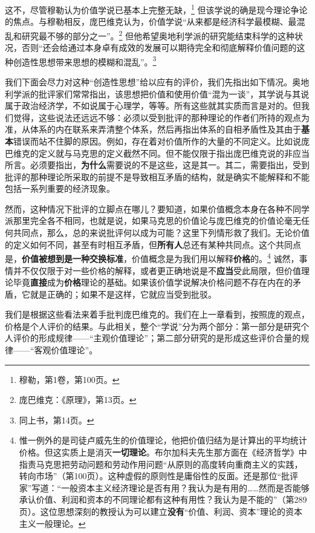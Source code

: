 \documentclass[fontset=fandol, a4paper, 12pt, openright]{ctexbook}
\begin{document}
这不，尽管穆勒认为价值学说已基本上完整无缺，\footnote{穆勒，第1卷，第100页。} 但该学说的确是现今理论争论的焦点。与穆勒相反，庞巴维克认为，价值学说“从来都是经济科学最模糊、最混乱和研究最不够的部分之一”。\footnote{庞巴维克：《原理》，第13页。} 但他希望奥地利学派的研究能结束科学的这种状况，否则“还会给通过本身卓有成效的发展可以期待完全和彻底解释价值问题的这种创造性思想带来思想的模糊和混乱”。\footnote{同上书，第14页。}

我们下面会尽力对这种“创造性思想”给以应有的评价，我们先指出如下情况。奥地利学派的批评家们常常指出，该思想把价值和使用价值“混为一谈”，其学说与其说属于政治经济学，不如说属于心理学，等等。所有这些就其实质而言是对的。但我们觉得，这些说法还远远不够：必须以受到批评的那种理论的作者们所持的观点为准，从体系的内在联系来弄清整个体系，然后再指出体系的自相矛盾性及其由于\textbf{基本}错误而站不住脚的原因。例如，存在着对价值所作的大量的不同定义。比如说庞巴维克的定义就与马克思的定义截然不同。但不能仅限于指出庞巴维克说的非应当所言。必须要指出，\textbf{为什么}需要说的不是这些，这是其一。其二，需要指出，受到批评的那种理论所采取的前提不是导致相互矛盾的结构，就是确实不能解释和不能包括一系列重要的经济现象。

然而，这种情况下批评的立脚点在哪儿？要知道，如果价值概念本身在各种不同学派那里完全各不相同，也就是说，如果马克思的价值论与庞巴维克的价值论毫无任何共同点，那么，总的来说批评何以成为可能？这里下列情形救了我们。无论价值的定义如何不同，甚至有时相互矛盾，但\textbf{所有人}总还有某种共同点。这个共同点是，\textbf{价值被想到是一种交换标准}，价值概念是为我们用以解释\textbf{价格}的。\footnote{惟一例外的是司徒卢威先生的价值理论，他把价值归结为是计算出的平均统计价格。但这实质上是消灭\textbf{一切理论}。布尔加科夫先生那方面在《经济哲学》中指责马克思把劳动问题和劳动作用问题“从原则的高度转向重商主义的实践，转向市场”（第100页）。这种虚假的原则性是庸俗性的反面。还是那位“批评家”写道：“一般资本主义经济理论是否有用？我认为是有用的……然而是否能够承认价值、利润和资本的不同理论都有这种有用性？我认为是不能的”（第289页）。这位思想深刻的教授认为可以建立\textbf{没有}“价值、利润、资本”理论的资本主义一般理论。} 诚然，事情并不仅仅限于对一些价格的解释，或者更正确地说是不\textbf{应当}受此局限，但价值理论毕竟\textbf{直接}成为\textbf{价格}理论的基础。如果该价值学说解决价格问题不存在内在的矛盾，它就是正确的；如果不是这样，它就应当受到批驳。

我们是根据这些看法来着手批判庞巴维克的。我们在上一章看到，按照庞的观点，价格是个人评价的结果。与此相关，整个“学说”分为两个部分：第一部分是研究个人评价的形成规律——“主观价值理论”；第二部分研究的是形成这些评价合量的规律——“客观价值理论”。
\end{document}
